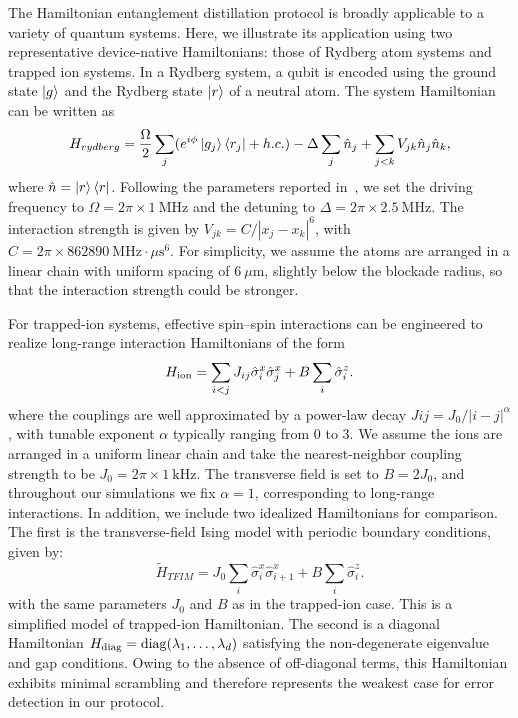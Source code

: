 \documentclass[onecolumn,prx,longbibliography,nofootinbib, superscriptaddress]{revtex4-2}
\theoremstyle{recap}
\begin{document}
The Hamiltonian entanglement distillation protocol is broadly applicable to a variety of quantum systems. Here, we illustrate its application using two representative device-native Hamiltonians: those of Rydberg atom systems and trapped ion systems. In a Rydberg system, a qubit is encoded using the ground state $\ket{g}$ and the Rydberg state $\ket{r}$ of a neutral atom. The system Hamiltonian can be written as
\begin{equation}
    H_{rydberg}=\frac{\Omega}{2}\sum_{j}(e^{i\phi}\ket{g_j}\bra{r_j}+h.c.)-\Delta\sum_{j}\hat{n}_j+\sum_{j<k}V_{jk}\hat{n}_j\hat{n}_k,
\end{equation}
where $\hat{n}=\ket{r}\bra{r}$. Following the parameters reported in~\cite{BloqadeHamiltonians}, we set the driving frequency to $\Omega = 2\pi \times 1~\mathrm{MHz}$ and the detuning to $\Delta = 2\pi \times 2.5~\mathrm{MHz}$. The interaction strength is given by $V_{jk} = C/|x_j - x_k|^6$, with $C = 2\pi \times 862890~\mathrm{MHz}\cdot\mu\mathrm{s}^6$. For simplicity, we assume the atoms are arranged in a linear chain with uniform spacing of $6~\mu\mathrm{m}$, slightly below the blockade radius, so that the interaction strength could be stronger.

For trapped-ion systems, effective spin–spin interactions can be engineered to realize long-range interaction Hamiltonians of the form~\cite{Monroe21RMP}
\begin{equation}
H_{\rm ion} = \sum_{i<j} J_{ij} \hat{\sigma}_i^x \hat{\sigma}_j^x + B \sum_i \hat{\sigma}_i^z.
\end{equation}
where the couplings are well approximated by a power-law decay $J{ij} = J_0/|i-j|^{\alpha}$, with tunable exponent $\alpha$ typically ranging from $0$ to $3$. We assume the ions are arranged in a uniform linear chain and take the nearest-neighbor coupling strength to be $J_0 = 2\pi \times 1~\mathrm{kHz}$. The transverse field is set to $B = 2J_0$, and throughout our simulations we fix $\alpha = 1$, corresponding to long-range interactions. In addition, we include two idealized Hamiltonians for comparison. The first is the transverse-field Ising model with periodic boundary conditions, given by:
\begin{equation}
\tilde{H}_{TFIM} = J_0 \sum_{i} \hat{\sigma}_i^x \hat{\sigma}_{i+1}^x + B \sum_i \hat{\sigma}_i^z.
\end{equation}
with the same parameters $J_0$ and $B$ as in the trapped-ion case. This is a simplified model of trapped-ion Hamiltonian. The second is a diagonal Hamiltonian $H_{\rm diag} = \mathrm{diag}(\lambda_1,\ldots,\lambda_d)$ satisfying the non-degenerate eigenvalue and gap conditions. Owing to the absence of off-diagonal terms, this Hamiltonian exhibits minimal scrambling and therefore represents the weakest case for error detection in our protocol.
\end{document}

